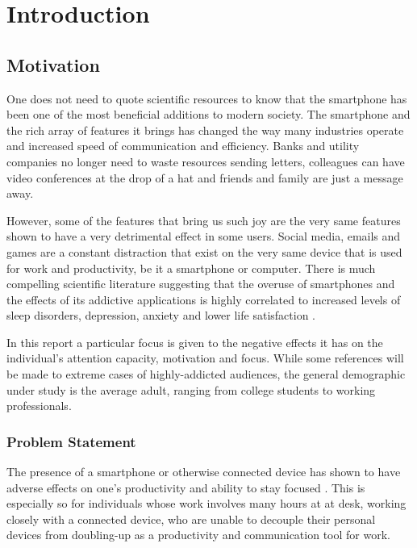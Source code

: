 \chapter{Introduction}

\section{Motivation}
One does not need to quote scientific resources to know that the smartphone has been one of the most beneficial additions to modern society. The smartphone and the rich array of features it brings has changed the way many industries operate and increased speed of communication and efficiency. Banks and utility companies no longer need to waste resources sending letters, colleagues can have video conferences at the drop of a hat and friends and family are just a message away.

However, some of the features that bring us such joy are the very same features shown to have a very detrimental effect in some users. Social media, emails and games are a constant distraction that exist on the very same device that is used for work and productivity, be it a smartphone or computer. There is much compelling scientific literature suggesting that the overuse of smartphones and the effects of its addictive applications is highly correlated to increased levels of sleep disorders, depression, anxiety and lower life satisfaction \cite{abi2020smartphones, lee2014hooked, demirci2015relationship}.

In this report a particular focus is given to the negative effects it has on the individual's attention capacity, motivation and focus. While some references will be made to extreme cases of highly-addicted audiences, the general demographic under study is the average adult, ranging from college students to working professionals.

\subsection{Problem Statement}
The presence of a smartphone or otherwise connected device has shown to have adverse effects on one's productivity and ability to stay focused \cite{thornton2014mere}. This is especially so for individuals whose work involves many hours at at desk, working closely with a connected device, who are unable to decouple their personal devices from doubling-up as a productivity and communication tool for work.

